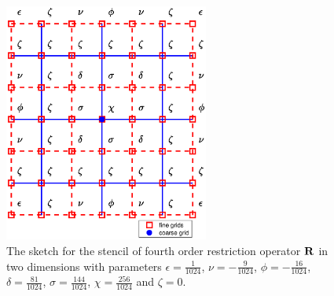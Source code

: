 \begin{figure}[htbp]
	\centering
	\includegraphics[width=0.6\textwidth]{restriction.eps}
	\caption{The sketch for the stencil of fourth order restriction operator ${\bf R}$ in two dimensions with parameters $\epsilon = \frac{1}{1024}$, $\nu = -\frac{9}{1024}$, $\phi = -\frac{16}{1024}$, $\delta = \frac{81}{1024}$, $\sigma = \frac{144}{1024}$, $\chi = \frac{256}{1024}$ and $\zeta = 0$.}\label{restriction}
\end{figure}




